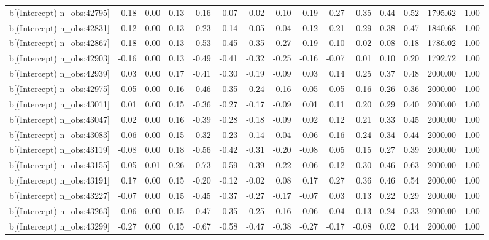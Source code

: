 \begin{table}[ht]
\begin{tabular}{rrrrrrrrrrrrrrr}
  b[(Intercept) n\_obs:42795] & 0.18 & 0.00 & 0.13 & -0.16 & -0.07 & 0.02 & 0.10 & 0.19 & 0.27 & 0.35 & 0.44 & 0.52 & 1795.62 & 1.00 \\ 
  b[(Intercept) n\_obs:42831] & 0.12 & 0.00 & 0.13 & -0.23 & -0.14 & -0.05 & 0.04 & 0.12 & 0.21 & 0.29 & 0.38 & 0.47 & 1840.68 & 1.00 \\ 
  b[(Intercept) n\_obs:42867] & -0.18 & 0.00 & 0.13 & -0.53 & -0.45 & -0.35 & -0.27 & -0.19 & -0.10 & -0.02 & 0.08 & 0.18 & 1786.02 & 1.00 \\ 
  b[(Intercept) n\_obs:42903] & -0.16 & 0.00 & 0.13 & -0.49 & -0.41 & -0.32 & -0.25 & -0.16 & -0.07 & 0.01 & 0.10 & 0.20 & 1792.72 & 1.00 \\ 
  b[(Intercept) n\_obs:42939] & 0.03 & 0.00 & 0.17 & -0.41 & -0.30 & -0.19 & -0.09 & 0.03 & 0.14 & 0.25 & 0.37 & 0.48 & 2000.00 & 1.00 \\ 
  b[(Intercept) n\_obs:42975] & -0.05 & 0.00 & 0.16 & -0.46 & -0.35 & -0.24 & -0.16 & -0.05 & 0.05 & 0.16 & 0.26 & 0.36 & 2000.00 & 1.00 \\ 
  b[(Intercept) n\_obs:43011] & 0.01 & 0.00 & 0.15 & -0.36 & -0.27 & -0.17 & -0.09 & 0.01 & 0.11 & 0.20 & 0.29 & 0.40 & 2000.00 & 1.00 \\ 
  b[(Intercept) n\_obs:43047] & 0.02 & 0.00 & 0.16 & -0.39 & -0.28 & -0.18 & -0.09 & 0.02 & 0.12 & 0.21 & 0.33 & 0.45 & 2000.00 & 1.00 \\ 
  b[(Intercept) n\_obs:43083] & 0.06 & 0.00 & 0.15 & -0.32 & -0.23 & -0.14 & -0.04 & 0.06 & 0.16 & 0.24 & 0.34 & 0.44 & 2000.00 & 1.00 \\ 
  b[(Intercept) n\_obs:43119] & -0.08 & 0.00 & 0.18 & -0.56 & -0.42 & -0.31 & -0.20 & -0.08 & 0.05 & 0.15 & 0.27 & 0.39 & 2000.00 & 1.00 \\ 
  b[(Intercept) n\_obs:43155] & -0.05 & 0.01 & 0.26 & -0.73 & -0.59 & -0.39 & -0.22 & -0.06 & 0.12 & 0.30 & 0.46 & 0.63 & 2000.00 & 1.00 \\ 
  b[(Intercept) n\_obs:43191] & 0.17 & 0.00 & 0.15 & -0.20 & -0.12 & -0.02 & 0.08 & 0.17 & 0.27 & 0.36 & 0.46 & 0.54 & 2000.00 & 1.00 \\ 
  b[(Intercept) n\_obs:43227] & -0.07 & 0.00 & 0.15 & -0.45 & -0.37 & -0.27 & -0.17 & -0.07 & 0.03 & 0.13 & 0.22 & 0.29 & 2000.00 & 1.00 \\ 
  b[(Intercept) n\_obs:43263] & -0.06 & 0.00 & 0.15 & -0.47 & -0.35 & -0.25 & -0.16 & -0.06 & 0.04 & 0.13 & 0.24 & 0.33 & 2000.00 & 1.00 \\ 
  b[(Intercept) n\_obs:43299] & -0.27 & 0.00 & 0.15 & -0.67 & -0.58 & -0.47 & -0.38 & -0.27 & -0.17 & -0.08 & 0.02 & 0.14 & 2000.00 & 1.00 \\ 

\end{tabular}
\end{table}

